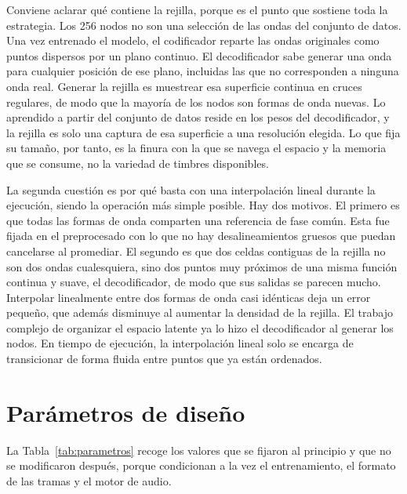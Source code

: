 Conviene aclarar qué contiene la rejilla, porque es el punto que sostiene toda
la estrategia. Los 256 nodos no son una selección de las ondas del conjunto de datos.
Una vez entrenado el modelo, el codificador reparte las ondas originales
como puntos dispersos por un plano continuo. El decodificador sabe generar una
onda para cualquier posición de ese plano, incluidas las que no corresponden a
ninguna onda real. Generar la rejilla es muestrear esa superficie continua en
cruces regulares, de modo que la mayoría de los nodos son formas de onda nuevas.
Lo aprendido a partir del conjunto de datos reside en los pesos del decodificador, y la
rejilla es solo una captura de esa superficie a una resolución elegida. Lo que
fija su tamaño, por tanto, es la finura con la que se navega el espacio y la
memoria que se consume, no la variedad de timbres disponibles.

La segunda cuestión es por qué basta con una interpolación lineal durante la
ejecución, siendo la operación más simple posible. Hay dos motivos. El primero
es que todas las formas de onda comparten una referencia de fase común. Esta fue fijada
en el preprocesado con lo que no hay desalineamientos gruesos que puedan
cancelarse al promediar. El segundo es que dos celdas contiguas de la rejilla no
son dos ondas cualesquiera, sino dos puntos muy próximos de una misma función
continua y suave, el decodificador, de modo que sus salidas se parecen mucho.
Interpolar linealmente entre dos formas de onda casi idénticas deja un error pequeño, 
que además disminuye al aumentar la densidad de la rejilla. El trabajo complejo de organizar 
el espacio latente ya lo hizo el decodificador al generar los nodos. En tiempo de ejecución,
la interpolación lineal solo se encarga de transicionar de forma fluida entre puntos que 
ya están ordenados.

\section{Parámetros de diseño}
\label{sec:parametros}
\hypertarget{RE1.2c}{}\label{RE1.2c}

La Tabla~\ref{tab:parametros} recoge los valores que se fijaron al principio y
que no se modificaron después, porque condicionan a la vez el entrenamiento, el
formato de las tramas y el motor de audio.

